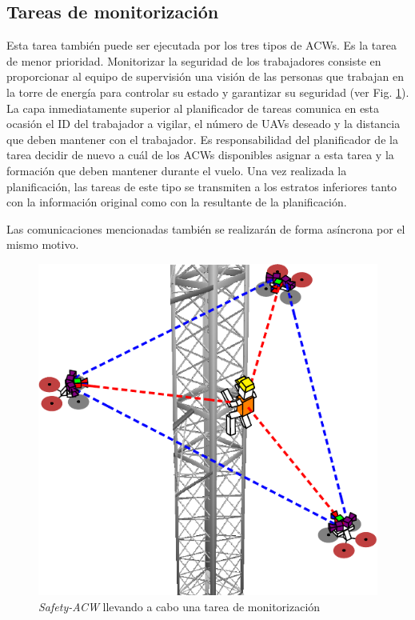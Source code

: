 \documentclass[fontsize=11pt, English=false, Español=true, Myfinal=true, twoside, numbers=noenddot]{scrbook}
\begin{document}
\subsection{Tareas de monitorización}
\label{subsec:MonitoringTasks}
Esta tarea también puede ser ejecutada por los tres tipos de \glspl{ACW}. Es la tarea de menor prioridad. Monitorizar la seguridad de los trabajadores consiste en proporcionar al equipo de supervisión una visión de las personas que trabajan en la torre de energía para controlar su estado y garantizar su seguridad (ver Fig. \ref{fig:monitor_task}). La capa inmediatamente superior al planificador de tareas comunica en esta ocasión el \gls{ID} del trabajador a vigilar, el número de \glspl{UAV} deseado y la distancia que deben mantener con el trabajador. Es responsabilidad del planificador de la tarea decidir de nuevo a cuál de los \glspl{ACW} disponibles asignar a esta tarea y la formación que deben mantener durante el vuelo. Una vez realizada la planificación, las tareas de este tipo se transmiten a los estratos inferiores tanto con la información original como con la resultante de la planificación.

Las comunicaciones mencionadas también se realizarán de forma asíncrona por el mismo motivo. 

\begin{figure}[htbp]
    \centering
    \includegraphics[width=0.5\linewidth]
    {ProblemFormulation/figures/monitor_task.pdf}
    \caption{\textit{Safety-ACW} llevando a cabo una tarea de monitorización}
    \label{fig:monitor_task}
\end{figure}
\end{document}
